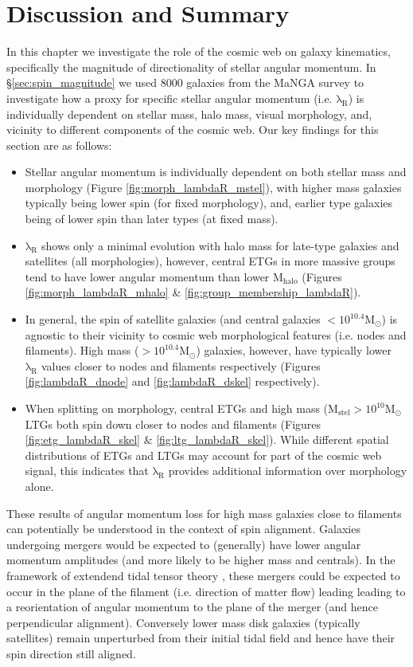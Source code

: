 \section{Discussion and Summary} \label{sec:cw_spin_conclusion}
In this chapter we investigate the role of the cosmic web on galaxy kinematics, specifically the magnitude of directionality of stellar angular momentum. In \S\ref{sec:spin_magnitude} we used 8000 galaxies from the MaNGA survey to investigate how a proxy for specific stellar angular momentum (i.e. $\mathrm{\lambda_R}$) is individually dependent on stellar mass, halo mass, visual morphology, and, vicinity to different components of the cosmic web. Our key findings for this section are as follows:
\begin{itemize}
    \item Stellar angular momentum is individually dependent on both stellar mass and morphology (Figure \ref{fig:morph_lambdaR_mstel}), with higher mass galaxies typically being lower spin (for fixed morphology), and, earlier type galaxies being of lower spin than later types (at fixed mass).
    \item $\mathrm{\lambda_R}$ shows only a minimal evolution with halo mass for late-type galaxies and satellites (all morphologies), however, central ETGs in more massive groups tend to have lower angular momentum than lower $\mathrm{M_{halo}}$ (Figures \ref{fig:morph_lambdaR_mhalo} \& \ref{fig:group_membership_lambdaR}). 
    \item In general, the spin of satellite galaxies (and central galaxies $\mathrm{< 10^{10.4}M_{\odot}}$) is agnostic to their vicinity to cosmic web morphological features (i.e. nodes and filaments). High mass ($\mathrm{> 10^{10.4}M_{\odot}}$) galaxies, however, have typically lower $\mathrm{\lambda_R}$ values closer to nodes and filaments respectively (Figures \ref{fig:lambdaR_dnode} and \ref{fig:lambdaR_dskel} respectively). 
    \item When splitting on morphology, central ETGs and high mass ($\mathrm{M_{stel} > 10^{10}M_{\odot}}$ LTGs both spin down closer to nodes and filaments (Figures \ref{fig:etg_lambdaR_skel} \& \ref{fig:ltg_lambdaR_skel}). While different spatial distributions of ETGs and LTGs may account for part of the cosmic web signal, this indicates that $\mathrm{\lambda_R}$ provides additional information over morphology alone.
\end{itemize}
These results of angular momentum loss for high mass galaxies close to filaments can potentially be understood in the context of spin alignment. Galaxies undergoing mergers would be expected to (generally) have lower angular momentum amplitudes (and more likely to be higher mass and centrals). In the framework of extendend tidal tensor theory \citep{laigle2015}, these mergers could be expected to occur in the plane of the filament (i.e. direction of matter flow) leading leading to a reorientation of angular momentum to the plane of the merger (and hence perpendicular alignment). Conversely lower mass disk galaxies (typically satellites) remain unperturbed from their initial tidal field and hence have their spin direction still aligned. 

